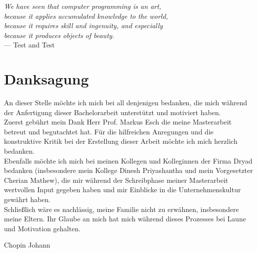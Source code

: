 
\begin{flushright}{\slshape
        We have seen that computer programming is an art, \\
        because it applies accumulated knowledge to the world, \\
        because it requires skill and ingenuity, and especially \\
        because it produces objects of beauty.} \\ \medskip
    --- Test \cite{bastienscapin} and Test \cite{usability}
\end{flushright}

\bigskip

\begingroup
\let\clearpage\relax
\let\cleardoublepage\relax
\let\cleardoublepage\relax
\chapter*{Danksagung}
An dieser Stelle möchte ich mich bei all denjenigen bedanken, die mich während der
Anfertigung dieser Bachelorarbeit unterstützt und motiviert haben.\\

Zuerst gebührt mein Dank Herr Prof. Markus Esch die
meine Masterarbeit betreut und begutachtet hat. Für die hilfreichen Anregungen und die
konstruktive Kritik bei der Erstellung dieser Arbeit möchte ich mich herzlich bedanken.\\

Ebenfalls möchte ich mich bei meinen Kollegen und Kolleginnen der Firma Dryad
bedanken (insbesondere mein Kollege Dinesh Priyashantha und mein Vorgesetzter Cherian Mathew), die mir während der Schreibphase meiner Masterarbeit wertvollen Input
gegeben haben und mir Einblicke in die Unternehmenskultur gewährt haben.\\

Schließlich wäre es nachlässig, meine Familie nicht zu erwähnen, insbesondere meine Eltern. Ihr Glaube an mich hat mich während dieses Prozesses bei Laune und Motivation gehalten.

Chopin Johann
\endgroup

